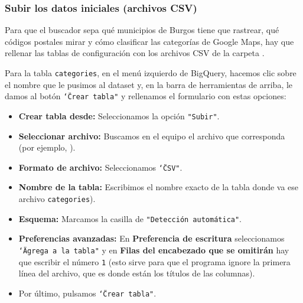 \subsubsection{Subir los datos iniciales (archivos CSV)}
Para que el buscador sepa qué municipios de Burgos tiene que rastrear, qué códigos postales mirar y cómo clasificar las categorías de Google Maps, hay que rellenar las tablas de configuración con los archivos CSV de la carpeta .

Para la tabla \texttt{categories}, en el menú izquierdo de BigQuery, hacemos clic sobre el nombre que le pusimos al dataset y, en la barra de herramientas de arriba, le damos al botón \texttt{\char`\"Crear tabla"} y rellenamos el formulario con estas opciones:
\begin{itemize}
    \item \textbf{Crear tabla desde:} Seleccionamos la opción \texttt{"Subir"}.
    \item \textbf{Seleccionar archivo:} Buscamos en el equipo el archivo que corresponda (por ejemplo, ).
    \item \textbf{Formato de archivo:} Seleccionamos \texttt{\char`\"CSV"}.
    \item \textbf{Nombre de la tabla:} Escribimos el nombre exacto de la tabla donde va ese archivo \texttt{categories}).
    \item \textbf{Esquema:} Marcamos la casilla de \texttt{"Detección automática"}.
    \item \textbf{Preferencias avanzadas:} En \textbf{Preferencia de escritura} seleccionamos \texttt{\char`\"Agrega a la tabla"} y en \textbf{Filas del encabezado que se omitirán} hay que escribir el número \texttt{1} (esto sirve para que el programa ignore la primera línea del archivo, que es donde están los títulos de las columnas).
    \item Por último, pulsamos \texttt{\char`\"Crear tabla"}.
\end{itemize}

